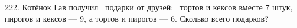 222. Котёнок Гав получил  подарки от друзей:  тортов и кексов вместе 7 штук, пирогов и кексов --- 9, а тортов и пирогов --- 6. Сколько всего подарков?\\
